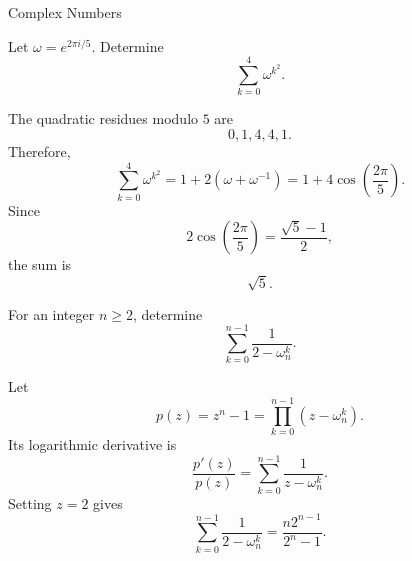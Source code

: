 \begin{expectedproblemgroup}{Complex Numbers}
        \begin{expectedsubproblem}
            Let $\omega=e^{2\pi i/5}$. Determine
            \[
                \sum_{k=0}^{4}\omega^{k^2}.
            \]
        \end{expectedsubproblem}

        \begin{expectedsubsolution}
            The quadratic residues modulo $5$ are
            \[
                0,1,4,4,1.
            \]
            Therefore,
            \[
                \sum_{k=0}^{4}\omega^{k^2}
                =
                1+2(\omega+\omega^{-1})
                =
                1+4\cos\left(\frac{2\pi}{5}\right).
            \]
            Since
            \[
                2\cos\left(\frac{2\pi}{5}\right)
                =
                \frac{\sqrt5-1}{2},
            \]
            the sum is
            \[
                \boxed{\sqrt5}.
            \]
        \end{expectedsubsolution}

        \begin{expectedsubproblem}
            For an integer $n\geq2$, determine
            \[
                \sum_{k=0}^{n-1}\frac{1}{2-\omega_n^k}.
            \]
        \end{expectedsubproblem}

        \begin{expectedsubsolution}
            Let
            \[
                p(z)=z^n-1
                =
                \prod_{k=0}^{n-1}(z-\omega_n^k).
            \]
            Its logarithmic derivative is
            \[
                \frac{p'(z)}{p(z)}
                =
                \sum_{k=0}^{n-1}\frac{1}{z-\omega_n^k}.
            \]
            Setting $z=2$ gives
            \[
                \boxed{
                    \sum_{k=0}^{n-1}\frac{1}{2-\omega_n^k}
                    =
                    \frac{n2^{n-1}}{2^n-1}
                }.
            \]
        \end{expectedsubsolution}

    \end{expectedproblemgroup}


